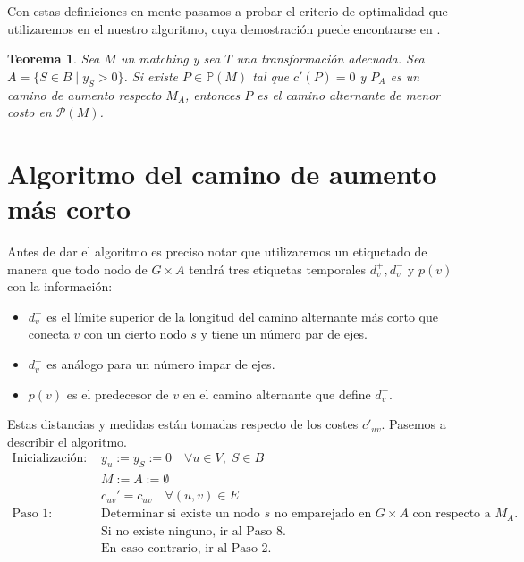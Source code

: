 \documentclass[twoside,a4paper,openright,12pt]{book}
\newtheorem{thm}{Teorema}[section]
\begin{document}
Con estas definiciones en mente pasamos a probar el criterio de optimalidad que utilizaremos en el nuestro algoritmo, cuya demostración puede encontrarse en \cite{derigs}.
\begin{thm}
Sea $M$ un matching y sea $T$ una transformación adecuada. Sea $A = \{S \in B\mid y_S>0\}$. Si existe $P\in \mathbb{P}(M)$ tal que $c'(P)=0$ y $P_A$ es un camino de aumento respecto $M_A$, entonces $P$ es el camino alternante de menor costo en $\mathcal{P}(M)$.
\end{thm}
\section{Algoritmo del camino de aumento más corto}
Antes de dar el algoritmo es preciso notar que utilizaremos un etiquetado de manera que todo nodo de $G\times A$ tendrá tres etiquetas temporales $d_v^+,d_v^-$ y $p(v)$ con la información:
\begin{itemize}
\item $d_v^+$ es el límite superior de la longitud del camino alternante más corto que conecta $v$ con un cierto nodo $s$ y tiene un número par de ejes.
\item $d_v^-$ es análogo para un número impar de ejes.
\item $p(v)$ es el predecesor de $v$ en el camino alternante que define $d_v^-$. 
\end{itemize}
Estas distancias y medidas están tomadas respecto de los costes $c'_{uv}$. Pasemos a describir el algoritmo.
\begin{align*}
\text{Inicialización: }& y_u:= y_S:= 0 \quad \forall u \in V,\; S\in B\\
& M:=A:=\emptyset\\
& c_{uv}' = c_{uv} \quad \forall (u,v)\in E\\
\text{Paso 1: }& \text{Determinar si existe un nodo $s$ no emparejado en $G\times A$ con respecto a $M_A$.}\\
&\text{Si no existe ninguno, ir al Paso 8.}\\
&\text{En caso contrario, ir al Paso 2.}
\end{align*}
\end{document}
